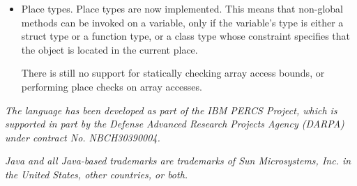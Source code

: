 \documentclass[12pt,twoside,notitlepage]{report}
\begin{document}
\begin{itemize}
\item{Place types.} Place types are now implemented. This means that
  non-global methods can be invoked on a variable, only if the
  variable's type is either a struct type or a function type, or a
  class type whose constraint specifies that the object is located in
  the current place.

  There is still no support for statically checking array access
  bounds, or performing place checks on array accesses.

\end{itemize}
{\em The \Xten{} language has been developed as part of the IBM PERCS
Project, which is supported in part by the Defense Advanced Research
Projects Agency (DARPA) under contract No. NBCH30390004.}

{\em Java and all Java-based trademarks are trademarks of Sun Microsystems,
Inc. in the United States, other countries, or both.}
\end{document}
